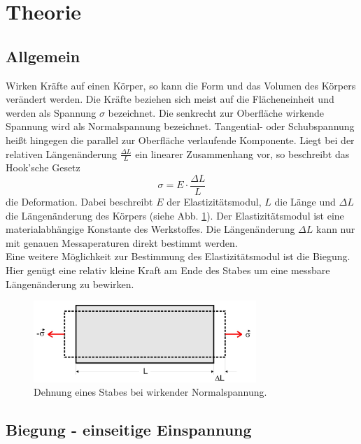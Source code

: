 \section{Theorie}
\label{sec:Theorie}
\subsection{Allgemein}
Wirken Kräfte auf einen Körper, so kann die Form und das Volumen des Körpers verändert werden.
Die Kräfte beziehen sich meist auf die Flächeneinheit und werden als Spannung $\sigma$ bezeichnet.
Die senkrecht zur Oberfläche wirkende Spannung wird als Normalspannung bezeichnet.
Tangential- oder Schubspannung heißt hingegen die parallel zur Oberfläche verlaufende Komponente.
Liegt bei der relativen Längenänderung $\frac{\Delta L}{L}$ ein linearer Zusammenhang vor, so beschreibt das Hook'sche Gesetz
\begin{equation}
    \sigma = E \cdot \frac{\Delta L}{L}
\end{equation}
die Deformation.
Dabei beschreibt $E$ der Elastizitätsmodul, $L$ die Länge und $\Delta L$ die Längenänderung des Körpers (siehe Abb. \ref{fig:spannung}).
Der Elastizitätsmodul ist eine materialabhängige Konstante des Werkstoffes.
Die Längenänderung $\Delta L$ kann nur mit genauen Messaperaturen direkt bestimmt werden.\\
Eine weitere Möglichkeit zur Bestimmung des Elastizitätsmodul ist die Biegung.
Hier genügt eine relativ kleine Kraft am Ende des Stabes um eine messbare Längenänderung zu bewirken.
\begin{figure}
    \centering
    \includegraphics[width=0.75\textwidth]{content/data/spannung.jpg}
    \caption{Dehnung eines Stabes bei wirkender Normalspannung.\cite{anleitung}}
    \label{fig:spannung}
\end{figure}
\subsection{Biegung - einseitige Einspannung}